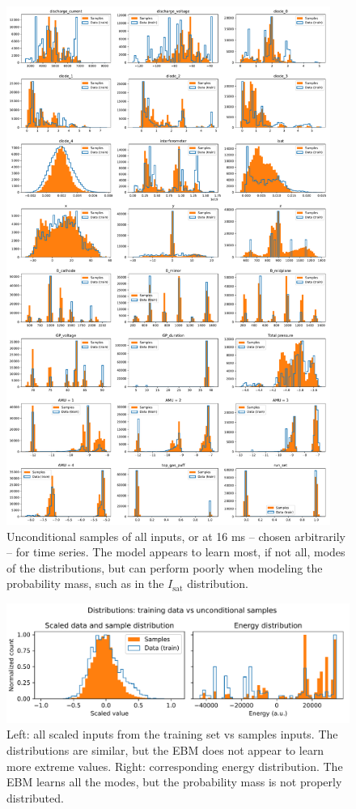 \begin{figure}
	\centering
	\includegraphics[width=300pt]{figures/uncond_histograms_39-0.pdf}
	\caption[Unconditional samples -- all inputs]{\label{fig:uncond_dist_full}Unconditional samples of all inputs, or at 16 ms -- chosen arbitrarily -- for time series. The model appears to learn most, if not all, modes of the distributions, but can perform poorly when modeling the probability mass, such as in the $I_\text{sat}$ distribution.}
\end{figure}

\begin{figure}
	\centering
	\includegraphics[width=\linewidth]{figures/uncond_histograms_merged_energy-dist_39-0}
	\caption[Histograms of scaled values and energy for unconditional samples]{\label{fig:uncond_energy}Left: all scaled inputs from the training set vs samples inputs. The distributions are similar, but the EBM does not appear to learn more extreme values. Right: corresponding energy distribution. The EBM learns all the modes, but the probability mass is not properly distributed.}
\end{figure}

